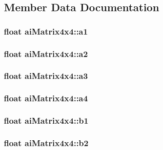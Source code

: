 \subsection{Member Data Documentation}
\hypertarget{structai_matrix4x4_aeabb269b7ef332d3c69c14d8af3d531c}{
\subsubsection[{a1}]{\setlength{\rightskip}{0pt plus 5cm}float ai\-Matrix4x4\-::a1}}\label{structai_matrix4x4_aeabb269b7ef332d3c69c14d8af3d531c}
\hypertarget{structai_matrix4x4_a9d36d992ba3cfc814913e0225a04b91b}{
\subsubsection[{a2}]{\setlength{\rightskip}{0pt plus 5cm}float ai\-Matrix4x4\-::a2}}\label{structai_matrix4x4_a9d36d992ba3cfc814913e0225a04b91b}
\hypertarget{structai_matrix4x4_a36f0d69cf678c3b5deea5a76f5624848}{
\subsubsection[{a3}]{\setlength{\rightskip}{0pt plus 5cm}float ai\-Matrix4x4\-::a3}}\label{structai_matrix4x4_a36f0d69cf678c3b5deea5a76f5624848}
\hypertarget{structai_matrix4x4_a184e1a78f61c430aa7b0079b42e4c2a0}{
\subsubsection[{a4}]{\setlength{\rightskip}{0pt plus 5cm}float ai\-Matrix4x4\-::a4}}\label{structai_matrix4x4_a184e1a78f61c430aa7b0079b42e4c2a0}
\hypertarget{structai_matrix4x4_a59667637f4d71bf4ebc1183bebe746fb}{
\subsubsection[{b1}]{\setlength{\rightskip}{0pt plus 5cm}float ai\-Matrix4x4\-::b1}}\label{structai_matrix4x4_a59667637f4d71bf4ebc1183bebe746fb}
\hypertarget{structai_matrix4x4_af5dcecf706021b313239b7113cb80daa}{
\subsubsection[{b2}]{\setlength{\rightskip}{0pt plus 5cm}float ai\-Matrix4x4\-::b2}}\label{structai_matrix4x4_af5dcecf706021b313239b7113cb80daa}
